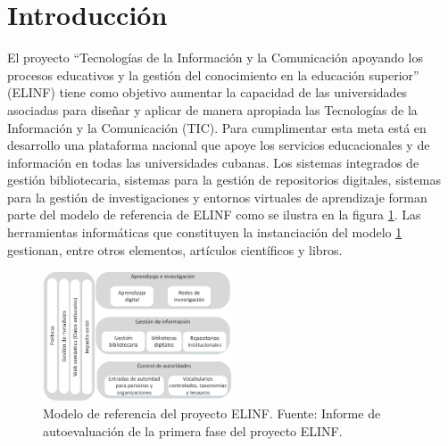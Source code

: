 %
\chapter*{\large Introducción}

\pagestyle{fancy}
\renewcommand{\sectionmark}[1]{\markright{#1}}

\lhead{}
\chead{}
\lfoot{}
\cfoot{}
\rfoot{\thepage}
\renewcommand{\headrulewidth}{0.4pt}

 \def\bibname{\large Introducción}

\pagestyle{fancy}
\lhead{}
\chead{}
\lfoot{}
\cfoot{}
\rfoot{\thepage}
\renewcommand{\headrulewidth}{0.4pt}
\vspace{-1cm}

El proyecto ``Tecnologías de la Información y la Comunicación apoyando los procesos educativos y la gestión del conocimiento en la educación superior'' (ELINF) tiene como objetivo aumentar la capacidad de las universidades asociadas para diseñar y aplicar de manera apropiada las Tecnologías de la Información y la Comunicación (TIC). Para cumplimentar esta meta está en desarrollo una plataforma nacional que apoye los servicios educacionales y de información en todas las universidades cubanas. Los sistemas integrados de gestión bibliotecaria, sistemas para la gestión de repositorios digitales, sistemas para la gestión de investigaciones y entornos virtuales de aprendizaje forman parte del modelo de referencia de ELINF como se ilustra en la figura \ref{fig: referenceModel}. Las herramientas informáticas que constituyen la instanciación del modelo \ref{fig: referenceModel} gestionan, entre otros elementos, artículos científicos y libros.

\begin{figure}
\begin{center}
	\includegraphics[width=0.5\textwidth]{img/referenceModel.png}
\end{center}
\caption{Modelo de referencia del proyecto ELINF. Fuente: Informe de autoevaluación de la primera fase del proyecto ELINF.}
\label{fig: referenceModel}
\end{figure}

